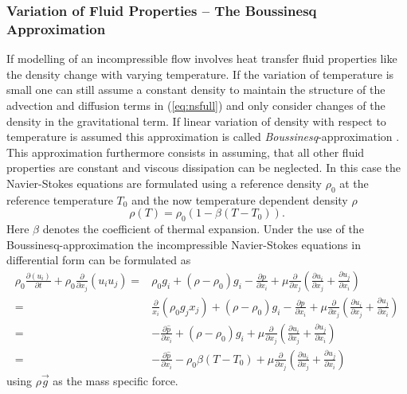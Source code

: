 \subsubsection{Variation of Fluid Properties -- The Boussinesq Approximation}
\label{sec:boussinesq}

If modelling of an incompressible flow involves heat transfer fluid properties like the density change with varying temperature. If the variation of temperature is small one can still assume a constant density to maintain the structure of the advection and diffusion terms in (\ref{eq:nsfull}) and only consider changes of the density in the gravitational term. If linear variation of density with respect to temperature is assumed this approximation is called \emph{Boussinesq}-approximation \cite{gray76}. This approximation furthermore consists in assuming, that all other fluid properties are constant and viscous dissipation can be neglected. In this case the Navier-Stokes equations are formulated using a reference density \(\rho_0\) at the reference temperature \(T_0\) and the now temperature dependent density \(\rho\)
\begin{equation}
  \rho \left( T \right) = \rho_0 \left( 1 - \beta \left( T - T_0 \right) \right).
\end{equation}
Here \(\beta\) denotes the coefficient of thermal expansion. Under the use of the Boussinesq-approximation the incompressible Navier-Stokes equations in differential form can be formulated as
\begin{align*}
  \rho_0 \frac{\partial \left( u_i \right)}{\partial t} 
  + \rho_0 \frac{\partial}{\partial x_j} \left( u_i  u_j \right) 
  =& \rho_0 g_i + \left(\rho - \rho_0 \right) g_i
  - \frac{\partial p}{\partial x_i}
  +  \mu \frac{\partial}{\partial x_j} \left( \frac{\partial u_i}{\partial x_j} 
  + \frac{\partial u_j}{\partial x_i} \right)  \\[0.5em]
  =& \frac{\partial}{x_i}\left(\rho_0 g_j x_j \right) 
  + \left(\rho - \rho_0 \right) g_i
  - \frac{\partial p}{\partial x_i}
  +  \mu \frac{\partial}{\partial x_j} \left( \frac{\partial u_i}{\partial x_j} 
  + \frac{\partial u_j}{\partial x_i} \right)  \\[0.5em]
  =& - \frac{\partial \hat{p}}{\partial x_i} 
  + \left(\rho - \rho_0 \right) g_i
  +  \mu \frac{\partial}{\partial x_j} \left( \frac{\partial u_i}{\partial x_j} 
  + \frac{\partial u_j}{\partial x_i} \right)  \\[0.5em]
  =& - \frac{\partial \hat{p}}{\partial x_i} 
  - \rho_0 \beta \left( T - T_0 \right)
  +  \mu \frac{\partial}{\partial x_j} \left( \frac{\partial u_i}{\partial x_j} 
                                       + \frac{\partial u_j}{\partial x_i} \right) 
\end{align*}
using \(\rho \vec{g}\) as the mass specific force. 

